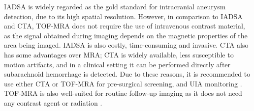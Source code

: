 IADSA is widely regarded as the gold standard for intracranial aneurysm detection, due to its high spatial resolution. However, in comparison to IADSA and CTA, TOF-MRA does not require the use of intravenous contrast material, as the signal obtained during imaging depends on the magnetic properties of the area being imaged. IADSA is also costly, time-consuming and invasive. CTA also has some advantages over MRA; CTA is widely available, less susceptible to motion artifacts, and in a clinical setting it can be performed directly after subarachnoid hemorrhage is detected. Due to these reasons, it is recommended to use either CTA or TOF-MRA for pre-surgical screening, and UIA monitoring \cite{Keedy2006, Sailer2014, Wardlaw2000}. TOF-MRA is also well-suited for routine follow-up imaging as it does not need any contrast agent or radiation \cite{Lane2015}.

